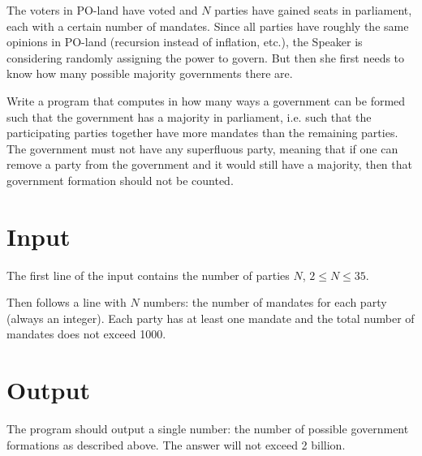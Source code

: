 
The voters in PO-land have voted and $N$ parties have gained seats in parliament, each with a
certain number of mandates. Since all parties have roughly the same opinions in PO-land (recursion
instead of inflation, etc.), the Speaker is considering randomly assigning the power to govern. But then
she first needs to know how many possible majority governments there are.

Write a program that computes in how many ways a government can be formed such that the government
has a majority in parliament, i.e. such that the participating parties together have
more mandates than the remaining parties. The government must not have any superfluous party, meaning
that if one can remove a party from the government and it would still have a majority,
then that government formation should not be counted.

\section*{Input}

The first line of the input contains the number of parties $N$, $2 \le N \le 35$.

Then follows a line with $N$ numbers: the number of mandates for each party (always an integer).
Each party has at least one mandate and the total number of mandates does not exceed 1000.

\section*{Output}

The program should output a single number: the number of possible government formations as described above.
The answer will not exceed 2 billion.
